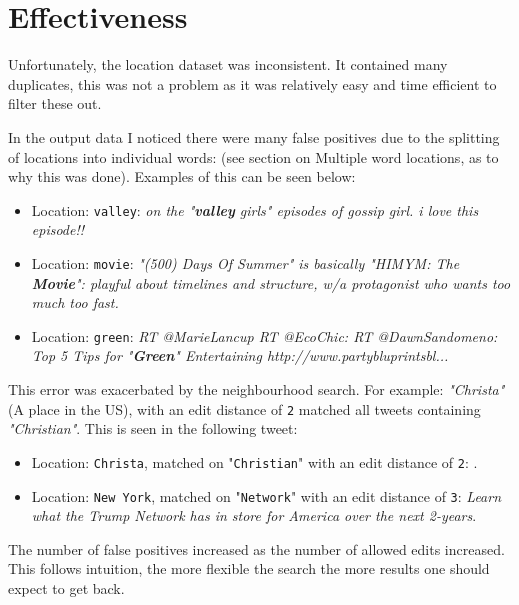 \documentclass[a4paper]{article}
\begin{document}
\section{Effectiveness}
Unfortunately, the location dataset was inconsistent. It contained many duplicates, this was not a problem as it was relatively easy and time efficient to filter these out.

In the output data I noticed there were many false positives due to the splitting of locations into individual words: (see section on Multiple word locations, as to why this was done). Examples of this can be seen below:
\begin{itemize}
\item Location: \texttt{valley}:  \textit{on the "\textbf{valley} girls" episodes of gossip girl. i love this episode!!}
\item Location: \texttt{movie}:   \textit{"(500) Days Of Summer" is basically "HIMYM: The \textbf{Movie}": playful about timelines and structure, w/a protagonist who wants too much too fast.}
\item Location: \texttt{green}:   \textit{RT @MarieLancup RT @EcoChic: RT @DawnSandomeno: Top 5 Tips for "\textbf{Green}" Entertaining http://www.partybluprintsbl...}
\end{itemize}

This  error was exacerbated by the neighbourhood search. For example: \textit{"Christa"} (A place in the US), with an edit distance of \texttt{2} matched all tweets containing \textit{"Christian"}. This is seen in the following tweet:
\begin{itemize}
 \item Location: \texttt{Christa}, matched on "\texttt{Christian}" with an edit distance of \texttt{2}: \newline {}.
 \item Location: \texttt{New York}, matched on "\texttt{Network}" with an edit distance of \texttt{3}:  \newline \textit{Learn what the Trump Network has in store for America over the next 2-years}.
\end{itemize}
The number of false positives increased as the number of allowed edits increased. This follows intuition, the more flexible the search the more results one should expect to get back.
\end{document}
